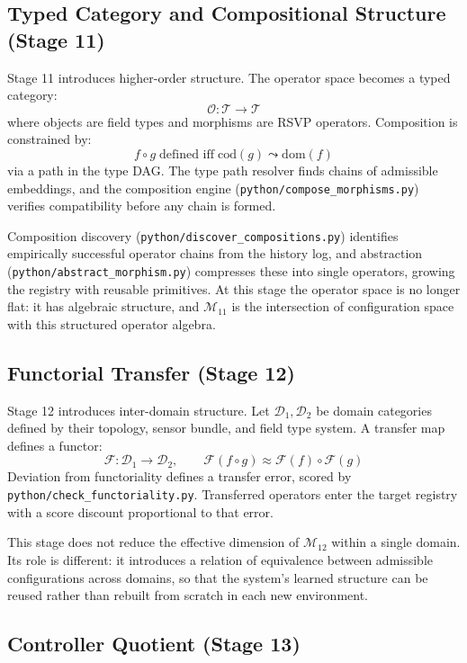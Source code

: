 \documentclass[12pt, oneside]{article}
\begin{document}
\subsection{Typed Category and Compositional Structure (Stage 11)}

Stage 11 introduces higher-order structure. The operator space becomes a typed category:
\[
\mathcal{O} : \mathcal{T} \to \mathcal{T}
\]
where objects are field types and morphisms are RSVP operators. Composition is
constrained by:
\[
f \circ g \;\text{defined iff}\; \mathrm{cod}(g) \leadsto \mathrm{dom}(f)
\]
via a path in the type DAG. The type path resolver finds chains of admissible embeddings,
and the composition engine (\texttt{python/compose\_morphisms.py}) verifies compatibility
before any chain is formed.

Composition discovery (\texttt{python/discover\_compositions.py}) identifies empirically
successful operator chains from the history log, and abstraction
(\texttt{python/abstract\_morphism.py}) compresses these into single operators, growing
the registry with reusable primitives. At this stage the operator space is no longer
flat: it has algebraic structure, and $\mathcal{M}_{11}$ is the intersection of
configuration space with this structured operator algebra.

\subsection{Functorial Transfer (Stage 12)}

Stage 12 introduces inter-domain structure. Let $\mathcal{D}_1, \mathcal{D}_2$ be
domain categories defined by their topology, sensor bundle, and field type system. A
transfer map defines a functor:
\[
\mathcal{F} : \mathcal{D}_1 \to \mathcal{D}_2, \qquad
\mathcal{F}(f \circ g) \approx \mathcal{F}(f) \circ \mathcal{F}(g)
\]
Deviation from functoriality defines a transfer error, scored by
\texttt{python/check\_functoriality.py}. Transferred operators enter the target registry
with a score discount proportional to that error.

This stage does not reduce the effective dimension of $\mathcal{M}_{12}$ within a single
domain. Its role is different: it introduces a relation of equivalence between admissible
configurations across domains, so that the system's learned structure can be reused
rather than rebuilt from scratch in each new environment.

\subsection{Controller Quotient (Stage 13)}
\end{document}

